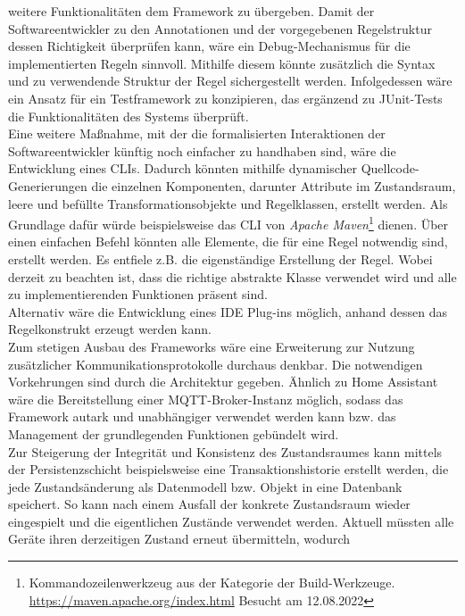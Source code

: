     weitere Funktionalitäten dem Framework zu übergeben. 
    Damit der Softwareentwickler zu den Annotationen und der vorgegebenen Regelstruktur dessen Richtigkeit überprüfen kann, wäre ein Debug-Mechanismus für die implementierten Regeln sinnvoll. 
    Mithilfe diesem könnte zusätzlich die Syntax und zu verwendende Struktur der Regel sichergestellt werden. Infolgedessen wäre ein Ansatz für ein Testframework zu konzipieren, das 
    ergänzend zu JUnit-Tests die Funktionalitäten des Systems überprüft. 
    \\
    \linebreak
    Eine weitere Maßnahme, mit der die formalisierten Interaktionen der Softwareentwickler künftig noch einfacher zu handhaben sind, wäre die Entwicklung eines \ac{CLI}s. Dadurch könnten mithilfe 
    dynamischer Quellcode-Generierungen die einzelnen Komponenten, darunter Attribute im Zustandsraum, leere und befüllte Transformationsobjekte und Regelklassen, erstellt werden. Als Grundlage dafür 
    würde beispielsweise das \acs{CLI} von \textit{Apache Maven}\footnote{Kommandozeilenwerkzeug aus der Kategorie der Build-Werkzeuge. \url{https://maven.apache.org/index.html} Besucht am 12.08.2022} 
    dienen. Über einen einfachen Befehl könnten alle Elemente, die für eine Regel notwendig sind, erstellt werden. Es entfiele z.B. die 
    eigenständige Erstellung der Regel. Wobei derzeit zu beachten ist, dass die richtige abstrakte Klasse verwendet wird und alle zu implementierenden Funktionen präsent sind. 
    \\
    Alternativ wäre die Entwicklung eines \ac{IDE} Plug-ins möglich, anhand dessen das Regelkonstrukt erzeugt werden kann. 
    \\
    \linebreak
    Zum stetigen Ausbau des Frameworks wäre eine Erweiterung zur Nutzung zusätzlicher Kommunikationsprotokolle durchaus denkbar. Die notwendigen Vorkehrungen sind durch die Architektur gegeben. 
    Ähnlich zu Home Assistant wäre die Bereitstellung einer \acs{MQTT}-Broker-Instanz möglich, sodass das Framework autark und unabhängiger verwendet werden kann bzw. das Management der grundlegenden Funktionen 
    gebündelt wird. 
    \\
    \linebreak
    Zur Steigerung der Integrität und Konsistenz des Zustandsraumes kann mittels der Persistenzschicht beispielsweise eine Transaktionshistorie erstellt werden, die jede Zustandsänderung als Datenmodell bzw. Objekt in eine 
    Datenbank speichert. So kann nach einem Ausfall der konkrete Zustandsraum wieder eingespielt und die eigentlichen Zustände verwendet werden. Aktuell müssten alle Geräte ihren derzeitigen Zustand erneut übermitteln, wodurch 
